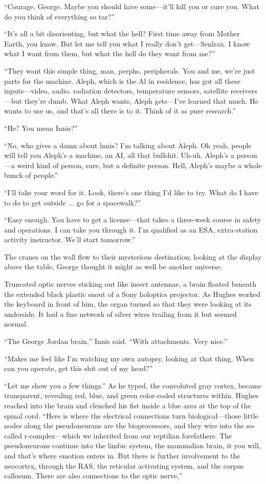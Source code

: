 ``Courage, George. Maybe you should have some—it'll kill you or cure you. What do you think of everything so tar?''

``It's all a bit disorienting, but what the hell? First time away from Mother Earth, you know. But let me tell you what I really don't get—Senlrax. I know what I want from them, but what the hell do they want from me?''

``They want this simple thing, man, perphs, peripherals. You and me, we're just parts for the machine. Aleph, which is the Al in residence, has got all these inputs—video, audio. radiation detectors, temperature sensors, satellite receivers—but they're dumb. What Aleph wants, Aleph gets—I've learned that much. He wants to use us, and that's all there is to it. Think of it as pure research.''

``He? You mean Innis?''

``No, who gives a damn about lnnis? I'm talking about Aleph. Oh yeah, people will tell you Aleph's a machine, an AI, all that bullshit. Uh-uh. Aleph's a person—a weird kind of person, sure, but a definite person. Hell, Aleph's maybe a whole bunch of people.''

``I'll take your word for it. Look, there's one thing I'd like to try. What do I have to do to get outside ... go for a spacewalk?''

``Easy enough. You have to get a license—that takes a three-week course in safety and operations. I can take you through it. I'm qualified as an ESA, extra-station activity instructor. We'll start tomorrow.''

The cranes on the wall flew to their mysterious destination; looking at the display above the table, George thought it might as well be another universe.

Truncated optic nerves sticking out like insect antennae, a brain floated beneath the extended black plastic snout of a Sony holoptics projector. As Hughes worked the keyboard in front of him, the organ turned so that they were looking at its underside. It had a fine network of silver wires trailing from it but seemed normal.

``The George Jordan brain,'' Innis said. ``With attachments. Very nice.''

``Makes me feel like I'm watching my own autopsy, looking at that thing. When can you operate, get this shit out of my head?''

``Let me show you a few things.'' As he typed, the convoluted gray cortex, became transparent, revealing red, blue, and green color-coded structures within. Hughes reached into the brain and clenched his fist inside a blue area at the top of the spinal cord. ``Here is where the electrical connections turn biological—those little nodes along the pseudoneurans are the bioprocessors, and they wire into the so-called r-complex—which we inherited from our reptilian forefathers. The pseudoneurons continue into the limbic system, the mammalian brain, it you will, and that's where emotion enters in. But there is further involvement to the neocortex, through the RAS, the reticular activating system, and the corpus callosum. There are also connections to the optic nerve,''

